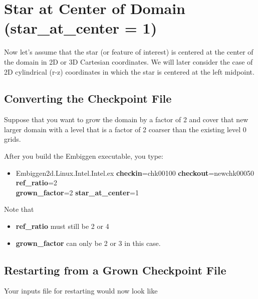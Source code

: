 \section{Star at Center of Domain ({\bf star\_at\_center = 1}) }

Now let's assume that the star (or feature of interest) is centered at the center of the
domain in 2D or 3D Cartesian coordinates. We will later consider the case of 2D cylindrical (r-z)
coordinates in which the star is centered at the left midpoint.

\subsection{Converting the Checkpoint File}

Suppose that you want to grow the domain by a factor of 2 and cover that
new larger domain with a level that is a factor of 2 coarser than the existing level 0 grids.

After you build the Embiggen executable, you type:

\begin{itemize}

\item Embiggen2d.Linux.Intel.Intel.ex {\bf checkin}=chk00100 {\bf checkout}=newchk00050 {\bf ref\_ratio}=2 \\
{\bf grown\_factor}=2  {\bf star\_at\_center}=1

\end{itemize}

Note that 
\begin{itemize}

\item {\bf ref\_ratio} must still be 2 or 4

\item {\bf grown\_factor} can only be 2 or 3 in this case.

\end{itemize}

\subsection{Restarting from a Grown Checkpoint File}

Your inputs file for restarting would now look like

